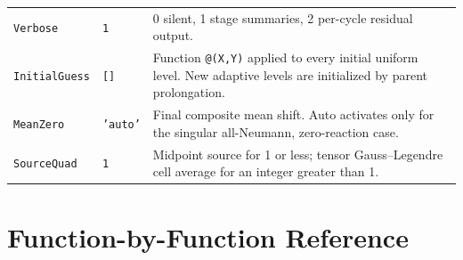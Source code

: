 \documentclass[11pt,oneside,openany]{book}
\newcommand{\code}[1]{\textnormal{\texttt{#1}}}
\begin{document}
\begin{longtable}{@{}p{}p{}p{}@{}}
\code{Verbose} & \code{1} & 0 silent, 1 stage summaries, 2 per-cycle residual output. \\
\code{InitialGuess} & \code{[]} & Function \code{@(X,Y)} applied to every initial uniform level. New adaptive levels are initialized by parent prolongation. \\
\code{MeanZero} & \code{'auto'} & Final composite mean shift. Auto activates only for the singular all-Neumann, zero-reaction case. \\
\code{SourceQuad} & \code{1} & Midpoint source for 1 or less; tensor Gauss--Legendre cell average for an integer greater than 1. \\
\bottomrule
\end{longtable}
\normalsize

\chapter{Function-by-Function Reference}
\label{app:functions}
\end{document}
